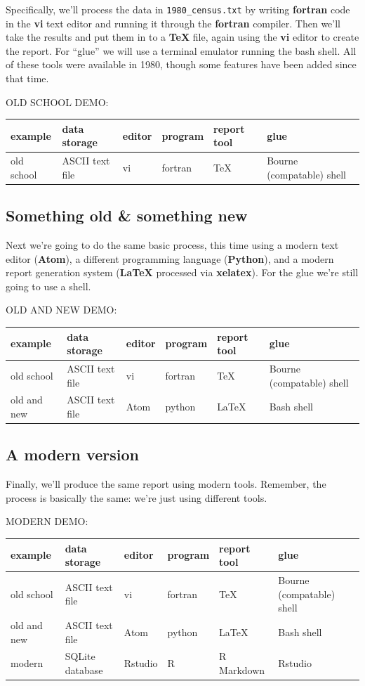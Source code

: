 \documentclass[]{book}
\begin{document}
Specifically, we'll process the data in \texttt{1980\_census.txt} by
writing \textbf{fortran} code in the \textbf{vi} text editor and running
it through the \textbf{fortran} compiler. Then we'll take the results
and put them in to a \textbf{TeX} file, again using the \textbf{vi}
editor to create the report. For ``glue'' we will use a terminal
emulator running the bash shell. All of these tools were available in
1980, though some features have been added since that time.

OLD SCHOOL DEMO:

\begin{longtable}[]{@{}llllll@{}}
\toprule
example & data storage & editor & program & report tool &
glue\tabularnewline
\midrule
\endhead
old school & ASCII text file & vi & fortran & TeX & Bourne (compatable)
shell\tabularnewline
\bottomrule
\end{longtable}

\subsection{Something old \& something
new}\label{something-old-something-new}

Next we're going to do the same basic process, this time using a modern
text editor (\textbf{Atom}), a different programming language
(\textbf{Python}), and a modern report generation system (\textbf{LaTeX}
processed via \textbf{xelatex}). For the glue we're still going to use a
shell.

OLD AND NEW DEMO:

\begin{longtable}[]{@{}llllll@{}}
\toprule
example & data storage & editor & program & report tool &
glue\tabularnewline
\midrule
\endhead
old school & ASCII text file & vi & fortran & TeX & Bourne (compatable)
shell\tabularnewline
old and new & ASCII text file & Atom & python & LaTeX & Bash
shell\tabularnewline
\bottomrule
\end{longtable}

\subsection{A modern version}\label{a-modern-version}

Finally, we'll produce the same report using modern tools. Remember, the
process is basically the same: we're just using different tools.

MODERN DEMO:

\begin{longtable}[]{@{}llllll@{}}
\toprule
example & data storage & editor & program & report tool &
glue\tabularnewline
\midrule
\endhead
old school & ASCII text file & vi & fortran & TeX & Bourne (compatable)
shell\tabularnewline
old and new & ASCII text file & Atom & python & LaTeX & Bash
shell\tabularnewline
modern & SQLite database & Rstudio & R & R Markdown &
Rstudio\tabularnewline
\bottomrule
\end{longtable}
\end{document}
